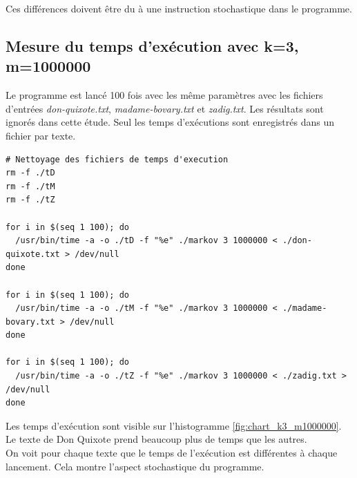 \documentclass[10pt, a4paper]{article}
\begin{document}
Ces différences doivent être du à une instruction stochastique dans le programme. \\

\subsection{Mesure du temps d'exécution avec k=3, m=1000000}

Le programme est lancé 100 fois avec les même paramètres avec les fichiers
d'entrées \emph{don-quixote.txt}, \emph{madame-bovary.txt} et \emph{zadig.txt}.
Les résultats sont ignorés dans cette étude. Seul les temps d'exécutions sont
enregistrés dans un fichier par texte. \\

\begin{verbatim}
# Nettoyage des fichiers de temps d'execution
rm -f ./tD
rm -f ./tM
rm -f ./tZ

for i in $(seq 1 100); do
  /usr/bin/time -a -o ./tD -f "%e" ./markov 3 1000000 < ./don-quixote.txt > /dev/null
done

for i in $(seq 1 100); do
  /usr/bin/time -a -o ./tM -f "%e" ./markov 3 1000000 < ./madame-bovary.txt > /dev/null
done

for i in $(seq 1 100); do
  /usr/bin/time -a -o ./tZ -f "%e" ./markov 3 1000000 < ./zadig.txt > /dev/null
done
\end{verbatim}

Les temps d'exécution sont visible sur l'histogramme
\ref{fig:chart_k3_m1000000}. Le texte de Don Quixote prend beaucoup plus de
temps que les autres. \\
On voit pour chaque texte que le temps de l'exécution est différentes à chaque
lancement. Cela montre l'aspect stochastique du programme. \\
\end{document}
